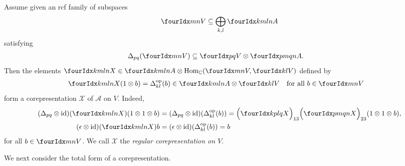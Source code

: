 \begin{Exa} \label{example:rep-regular}
  Assume  given an rcf family of subspaces
  \begin{align*}
    \Gru{V}{m}{n} \subseteq \bigoplus_{k,l} \Gr{A}{k}{l}{m}{n}
  \end{align*}
  satisfying
  \begin{align} \label{eq:rep-regular-inclusion}
    \Delta_{pq}(\Gru{V}{m}{n}) &\subseteq \Gru{V}{p}{q} \otimes
    \Gr{A}{p}{q}{m}{n}.
  \end{align}
Then the  elements $\Gr{X}{k}{l}{m}{n} \in \Gr{A}{k}{l}{m}{n} \otimes
  \Hom_{\C}(\Gru{V}{m}{n},\Gru{V}{k}{l})$ defined by 
  \begin{align*}
    \Gr{X}{k}{l}{m}{n}(1 \otimes b) &= \Delta^{\op}_{kl}(b) \in
    \Gr{A}{k}{l}{m}{n} \otimes \Gru{V}{k}{l} \quad
    \text{for all } b\in \Gru{V}{m}{n}
  \end{align*}
  form a corepresentation $\mathscr{X}$ of $\mathscr{A}$ on
  $V$. Indeed, 
  \begin{align*}
    (\Delta_{pq} \otimes \id)(\Gr{X}{k}{l}{m}{n})(1 \otimes 1 \otimes
    b) &=(\Delta_{pq}\otimes \id)(\Delta^{\op}_{kl}(b)) =
    \Big{(}\Gr{X}{k}{l}{p}{q}\Big{)}_{13}\Big{(}\Gr{X}{p}{q}{m}{n}\Big{)}_{23}(1
    \otimes 1 \otimes b), \\
    (\epsilon \otimes \id)(\Gr{X}{k}{l}{m}{n})b &= (\epsilon \otimes
    \id)(\Delta^{\op}_{kl}(b)) = b
  \end{align*}
  for all $b\in \Gru{V}{m}{n}$.  We call $\mathscr{X}$ the
  \emph{regular corepresentation on $V$}. 
\end{Exa}

We next consider the total form of a corepresentation.

